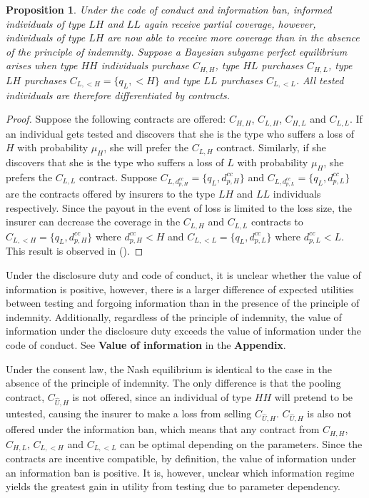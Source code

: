 \documentclass[nonatbib,preprint,12pt]{elsarticle}
\theoremstyle{plain}
\newtheorem{prop}[theorem]{Proposition}
\theoremstyle{definition}
\theoremstyle{plain}
\theoremstyle{TheoremNum}
\theoremstyle{CorollaryNum}
\theoremstyle{PropositionNum}
\theoremstyle{TheoremNum}
\begin{document}
\setcounter{theorem}{9}
\renewcommand{\thetheorem}{\arabic{theorem}}
\begin{prop}
Under the code of conduct and information ban, informed individuals of type $LH$ and $LL$ again receive partial coverage, however, individuals of type $LH$ are now able to receive more coverage than in the absence of the principle of indemnity. Suppose a Bayesian subgame perfect equilibrium arises when type $HH$ individuals purchase $C_{H,H}$, type $HL$ purchases $C_{H,L}$, type $LH$ purchases $C_{L,<H} = \{q_L,<H\}$ and type $LL$ purchases $C_{L,<L}$. All tested individuals are therefore differentiated by contracts.
\end{prop}

\begin{proof}
Suppose the following contracts are offered: $C_{H,H}$, $C_{L,H}$, $C_{H,L}$ and $C_{L,L}$. If an individual gets tested and discovers that she is the type who suffers a loss of $H$ with probability $\mu_H$, she will prefer the $C_{L,H}$ contract. Similarly, if she discovers that she is the type who suffers a loss of $L$ with probability $\mu_H$, she prefers the $C_{L,L}$ contract. Suppose $C_{L,d_{p,H}^{cc}} = \{q_L,d_{p,H}^{cc}\}$ and $C_{L, d_{p,L}^{cc}} = \{q_L, d_{p,L}^{cc}\}$ are the contracts offered by insurers to the type $LH$ and $LL$ individuals respectively. Since the payout in the event of loss is limited to the loss size, the insurer can decrease the coverage in the $C_{L,H}$ and $C_{L,L}$ contracts to $C_{L,<H} = \{q_L, d_{p,H}^{cc}\}$ where $d_{p,H}^{cc} < H$ and $C_{L,<L} = \{q_L, d_{p,L}^{cc}\}$ where $d_{p,L}^{cc}<L$. This result is observed in \citeauthor*{peter2017endogenous} (\citeyear{peter2017endogenous}). 
\end{proof}

Under the disclosure duty and code of conduct, it is unclear whether the value of information is positive, however, there is a larger difference of expected utilities between testing and forgoing information than in the presence of the principle of indemnity. Additionally, regardless of the principle of indemnity, the value of information under the disclosure duty exceeds the value of information under the code of conduct. See \textbf{Value of information} in the \textbf{Appendix}. 

Under the consent law, the Nash equilibrium is identical to the case in the absence of the principle of indemnity. The only difference is that the pooling contract, $C_{\widehat{U},H}$ is not offered, since an individual of type $HH$ will pretend to be untested, causing the insurer to make a loss from selling $C_{\widehat{U},H}$. $C_{\widehat{U},H}$ is also not offered under the information ban, which means that any contract from $C_{H,H}$, $C_{H,L}$, $C_{L,<H}$ and $C_{L,<L}$ can be optimal depending on the parameters. Since the contracts are incentive compatible, by definition, the value of information under an information ban is positive. It is, however, unclear which information regime yields the greatest gain in utility from testing due to parameter dependency.
\end{document}
